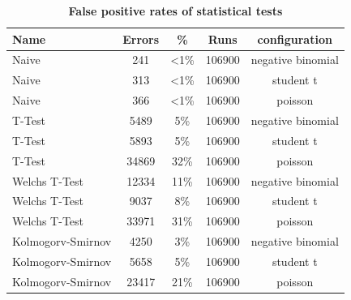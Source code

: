 \begin{table}[htp]
    \centering
    \begin{tabular}{lcccc} %
        {\bf Name} & {\bf Errors} & {\bf \%} & {\bf Runs} & {\bf configuration}\\
        \hline %
        Naive               & 241 & <1\% & 106900 & negative binomial\\
        Naive               & 313 & <1\% & 106900 & student t\\
        Naive               & 366 & <1\% & 106900 & poisson\\
        \hline
        T-Test              & 5489 & 5\%  & 106900 & negative binomial\\
        T-Test              & 5893 & 5\%  & 106900 & student t\\
        T-Test              & 34869 & 32\%  & 106900 & poisson\\
        \hline
        Welchs T-Test       & 12334 & 11\%  & 106900 & negative binomial\\
        Welchs T-Test       & 9037 & 8\%  & 106900 & student t\\
        Welchs T-Test       & 33971 & 31\%  & 106900 & poisson\\
        \hline
        Kolmogorv-Smirnov   & 4250 & 3\%  & 106900 & negative binomial\\
        Kolmogorv-Smirnov   & 5658 & 5\%  & 106900 & student t\\
        Kolmogorv-Smirnov   & 23417 & 21\%  & 106900 & poisson\\
        \hline
        
    
    \end{tabular}
    \caption[False positive rates of statistical tests]{\textbf{False positive rates of statistical tests}}
    \label{fig:false_positives}
\end{table}
